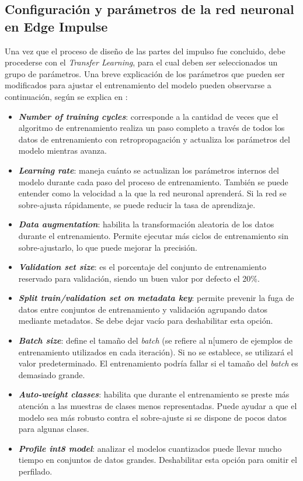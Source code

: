 \subsection{Configuración y parámetros de la red neuronal en Edge Impulse}  
Una vez que el proceso de diseño de las partes del impulso fue concluido, debe procederse con el \textit{Transfer Learning}, para el cual deben ser seleccionados un grupo de parámetros. Una breve explicación de los parámetros que pueden ser modificados para ajustar el entrenamiento del modelo pueden observarse a continuación, según se explica en \cite{EIP}: 

\begin{itemize}
    \item \textit{\textbf{Number of training cycles}}: corresponde a la cantidad de veces que el algoritmo de entrenamiento realiza un paso completo a través de todos los datos de entrenamiento con retropropagación y actualiza los parámetros del modelo mientras avanza.

    \item \textit{\textbf{Learning rate}}: maneja cuánto se actualizan los parámetros internos del modelo durante cada paso del proceso de entrenamiento. También se puede entender como la velocidad a la que la red neuronal aprenderá. Si la red se sobre-ajusta rápidamente, se puede reducir la tasa de aprendizaje.

    \item \textit{\textbf{Data augmentation}}: habilita la transformación aleatoria de los datos durante el entrenamiento. Permite ejecutar más ciclos de entrenamiento sin sobre-ajustarlo, lo que puede mejorar la precisión.

    \item \textit{\textbf{Validation set size}}: es el porcentaje del conjunto de entrenamiento reservado para validación, siendo un buen valor por defecto el 20\%.

    \item \textit{\textbf{Split train/validation set on metadata key}}: permite prevenir la fuga de datos entre conjuntos de entrenamiento y validación agrupando datos mediante metadatos. Se debe dejar vacío para deshabilitar esta opción.

    \item \textit{\textbf{Batch size}}: define el tamaño del \textit{batch} (se refiere al n[umero de ejemplos de entrenamiento utilizados en cada iteración). Si no se establece, se utilizará el valor predeterminado. El entrenamiento podría fallar si el tamaño del \textit{batch} es demasiado grande. 

    \item \textit{\textbf{Auto-weight classes}}: habilita que durante el entrenamiento se preste más atención a las muestras de clases menos representadas. Puede ayudar a que el modelo sea más robusto contra el sobre-ajuste si se dispone de pocos datos para algunas clases.

    \item \textit{\textbf{Profile int8 model}}: analizar el modelos cuantizados puede llevar mucho tiempo en conjuntos de datos grandes. Deshabilitar esta opción para omitir el perfilado.
\end{itemize}


